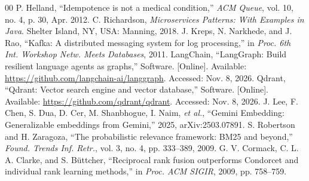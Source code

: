 \documentclass{IEEEtran}
\begin{document}
\begin{thebibliography}{00}
 P. Helland, ``Idempotence is not a medical condition,'' \textit{ACM Queue}, vol. 10, no. 4, p. 30, Apr. 2012.
 C. Richardson, \textit{Microservices Patterns: With Examples in Java}. Shelter Island, NY, USA: Manning, 2018.
 J. Kreps, N. Narkhede, and J. Rao, ``Kafka: A distributed messaging system for log processing,'' in \textit{Proc. 6th Int. Workshop Netw. Meets Databases}, 2011.
 LangChain, ``LangGraph: Build resilient language agents as graphs,'' Software. [Online]. Available: \url{https://github.com/langchain-ai/langgraph}. Accessed: Nov. 8, 2026.
 Qdrant, ``Qdrant: Vector search engine and vector database,'' Software. [Online]. Available: \url{https://github.com/qdrant/qdrant}. Accessed: Nov. 8, 2026.
 J. Lee, F. Chen, S. Dua, D. Cer, M. Shanbhogue, I. Naim, \textit{et al.}, ``Gemini Embedding: Generalizable embeddings from Gemini,'' 2025, arXiv:2503.07891.
 S. Robertson and H. Zaragoza, ``The probabilistic relevance framework: BM25 and beyond,'' \textit{Found. Trends Inf. Retr.}, vol. 3, no. 4, pp. 333--389, 2009.
 G. V. Cormack, C. L. A. Clarke, and S. B\"{u}ttcher, ``Reciprocal rank fusion outperforms Condorcet and individual rank learning methods,'' in \textit{Proc. ACM SIGIR}, 2009, pp. 758--759.
\end{thebibliography}
\end{document}
